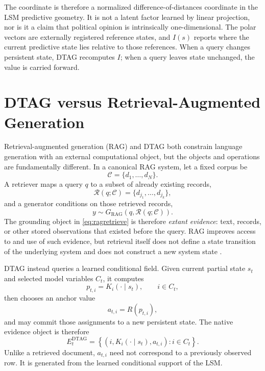 \documentclass[journal]{IEEEtran}
\newcommand{\1}{\mathbf{1}}
\begin{document}
The coordinate is therefore a normalized difference-of-distances coordinate in the LSM predictive geometry. It is not a latent factor learned by linear projection, nor is it a claim that political opinion is intrinsically one-dimensional. The polar vectors are externally registered reference states, and $I(s)$ reports where the current predictive state lies relative to those references. When a query changes persistent state, DTAG recomputes $I$; when a query leaves state unchanged, the value is carried forward.


\section{DTAG versus Retrieval-Augmented Generation}
\label{sec:rag}

Retrieval-augmented generation (RAG) and DTAG both constrain language generation with an external computational object, but the objects and operations are fundamentally different. In a canonical RAG system, let a fixed corpus be
\begin{equation}
  \mathcal{C}=\{d_1,\ldots,d_N\}.
\end{equation}
A retriever maps a query $q$ to a subset of already existing records,
\begin{equation}
  \mathcal{R}(q;\mathcal{C})=\{d_{j_1},\ldots,d_{j_k}\},
  \label{eq:ragretrieve}
\end{equation}
and a generator conditions on those retrieved records,
\begin{equation}
  y\sim G_{\mathrm{RAG}}\!\left(q,\mathcal{R}(q;\mathcal{C})\right).
  \label{eq:raggenerate}
\end{equation}
The grounding object in \eqref{eq:ragretrieve} is therefore \emph{extant evidence}: text, records, or other stored observations that existed before the query. RAG improves access to and use of such evidence, but retrieval itself does not define a state transition of the underlying system and does not construct a new system state \cite{lewis2020rag}.

DTAG instead queries a learned conditional field. Given current partial state $s_t$ and selected model variables $C_t$, it computes
\begin{equation}
  p_{t,i}=K_i(\cdot\mid s_t),\qquad i\in C_t,
  \label{eq:dtagperturbdist}
\end{equation}
then chooses an anchor value
\begin{equation}
  a_{t,i}=R(p_{t,i}),
\end{equation}
and may commit those assignments to a new persistent state. The native evidence object is therefore
\begin{equation}
  E_t^{\mathrm{DTAG}}
  =\left\{\left(i,K_i(\cdot\mid s_t),a_{t,i}\right):i\in C_t\right\}.
  \label{eq:dtagevidence}
\end{equation}
Unlike a retrieved document, $a_{t,i}$ need not correspond to a previously observed row. It is generated from the learned conditional support of the LSM.
\end{document}
